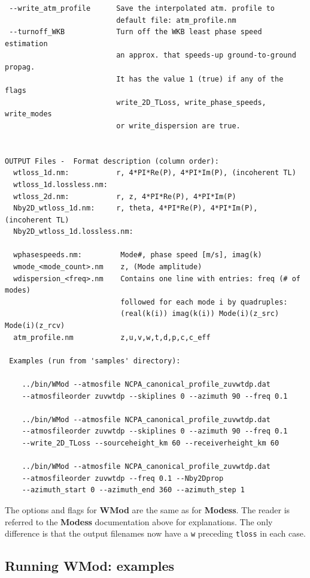 \begin{verbatim}
 --write_atm_profile      Save the interpolated atm. profile to
                          default file: atm_profile.nm
 --turnoff_WKB            Turn off the WKB least phase speed estimation
                          an approx. that speeds-up ground-to-ground propag.
                          It has the value 1 (true) if any of the flags
                          write_2D_TLoss, write_phase_speeds, write_modes
                          or write_dispersion are true.


OUTPUT Files -  Format description (column order):
  wtloss_1d.nm:           r, 4*PI*Re(P), 4*PI*Im(P), (incoherent TL)
  wtloss_1d.lossless.nm:
  wtloss_2d.nm:           r, z, 4*PI*Re(P), 4*PI*Im(P)
  Nby2D_wtloss_1d.nm:     r, theta, 4*PI*Re(P), 4*PI*Im(P), (incoherent TL)
  Nby2D_wtloss_1d.lossless.nm:

  wphasespeeds.nm:         Mode#, phase speed [m/s], imag(k)
  wmode_<mode_count>.nm    z, (Mode amplitude)
  wdispersion_<freq>.nm    Contains one line with entries: freq (# of modes)
                           followed for each mode i by quadruples: 
                           (real(k(i)) imag(k(i)) Mode(i)(z_src) Mode(i)(z_rcv)
  atm_profile.nm           z,u,v,w,t,d,p,c,c_eff

 Examples (run from 'samples' directory):

    ../bin/WMod --atmosfile NCPA_canonical_profile_zuvwtdp.dat 
    --atmosfileorder zuvwtdp --skiplines 0 --azimuth 90 --freq 0.1

    ../bin/WMod --atmosfile NCPA_canonical_profile_zuvwtdp.dat 
    --atmosfileorder zuvwtdp --skiplines 0 --azimuth 90 --freq 0.1 
    --write_2D_TLoss --sourceheight_km 60 --receiverheight_km 60

    ../bin/WMod --atmosfile NCPA_canonical_profile_zuvwtdp.dat 
    --atmosfileorder zuvwtdp --freq 0.1 --Nby2Dprop 
    --azimuth_start 0 --azimuth_end 360 --azimuth_step 1
\end{verbatim}

The options and flags for {\bf WMod} are the same as for {\bf Modess}. The reader is referred to the {\bf Modess} documentation above for explanations. The only difference is that the output filenames now have a \verb+w+ preceding \verb+tloss+ in each case. 


\subsection{Running WMod: examples}
\label{sec: wmod examples}

